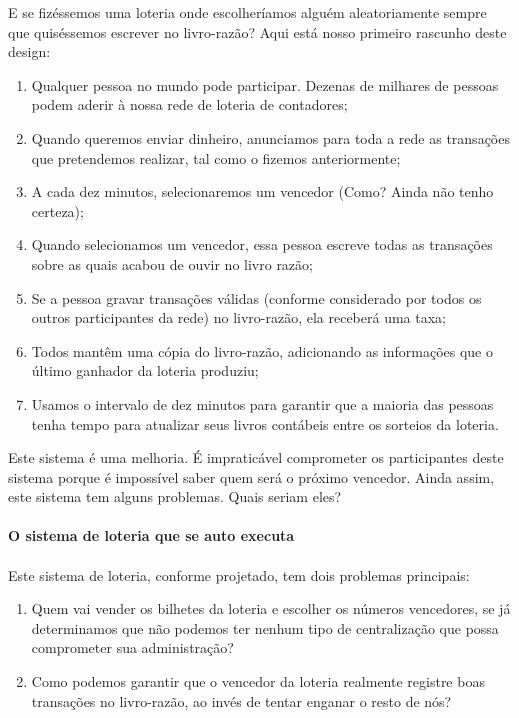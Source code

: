 E se fizéssemos uma loteria onde escolheríamos alguém aleatoriamente sempre que quiséssemos escrever no livro-razão? Aqui está nosso primeiro rascunho deste design:

\begin{samepage}
\begin{enumerate}
\item Qualquer pessoa no mundo pode participar. Dezenas de milhares de pessoas podem aderir à nossa rede de loteria de contadores;
\item Quando queremos enviar dinheiro, anunciamos para toda a rede as transações que pretendemos realizar, tal como o fizemos anteriormente;
\item A cada dez minutos, selecionaremos um vencedor (Como? Ainda não tenho certeza);
\item Quando selecionamos um vencedor, essa pessoa escreve todas as transações sobre as quais acabou de ouvir no livro razão;
\item Se a pessoa gravar transações válidas (conforme considerado por todos os outros participantes da rede) no livro-razão, ela receberá uma taxa;
\item Todos mantêm uma cópia do livro-razão, adicionando as informações que o último ganhador da loteria produziu;
\item Usamos o intervalo de dez minutos para garantir que a maioria das pessoas tenha tempo para atualizar seus livros contábeis entre os sorteios da loteria.
\end{enumerate}
\end{samepage}

Este sistema é uma melhoria. É impraticável comprometer os participantes deste sistema porque é impossível saber quem será o próximo vencedor. Ainda assim, este sistema tem alguns problemas. Quais seriam eles?
\newpage

\paragraph{O sistema de loteria que se auto executa}
\paragraph{}
Este sistema de loteria, conforme projetado, tem dois problemas principais:

\begin{samepage}
\begin{enumerate}
\item Quem vai vender os bilhetes da loteria e escolher os números vencedores, se já determinamos que não podemos ter nenhum tipo de centralização que possa comprometer sua administração?
\item Como podemos garantir que o vencedor da loteria realmente registre boas transações no livro-razão, ao invés de tentar enganar o resto de nós?
\end{enumerate}
\end{samepage}

